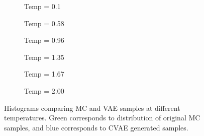 \documentclass[12pt,a4paper]{article}
\begin{document}
\begin{figure}[h!]
    \centering
    \begin{subfigure}[t]{0.49\textwidth}
        \caption{Temp = 0.1}
    \end{subfigure}
    \hfill
    \begin{subfigure}[t]{0.49\textwidth}
        \caption{Temp = 0.58}
    \end{subfigure}
    \hfill
    \begin{subfigure}[t]{0.49\textwidth}
        \caption{Temp = 0.96}
    \end{subfigure}
    \hfill
    \begin{subfigure}[t]{0.49\textwidth}
        \caption{Temp = 1.35}
    \end{subfigure}
    \hfill
    \begin{subfigure}[t]{0.49\textwidth}
        \caption{Temp = 1.67}
    \end{subfigure}
    \hfill
    \begin{subfigure}[t]{0.49\textwidth}
        \caption{Temp = 2.00}
    \end{subfigure}
    \hfill
    \caption{Histograms comparing MC and VAE samples at different temperatures. Green corresponds to distribution of original MC samples, and blue corresponds to CVAE generated samples.}
\end{figure}
\end{document}
